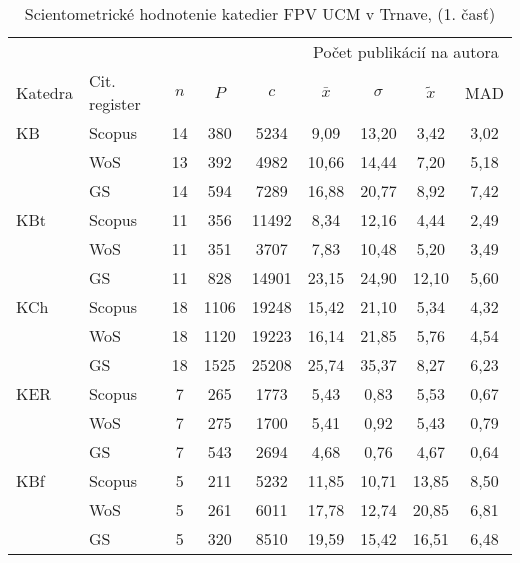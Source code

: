 {\begin{table}
\centering\small
  \caption[Hodnotenie FPV\,--\,počet publikácií na autora]{Scientometrické hodnotenie katedier FPV UCM v Trnave, (1. časť)}
  \label{tab:1-staff.results}
\begin{tabularx}{\textwidth}{lXc@{\hspace{2.5em}}c@{\hspace{2.5em}}c@{\hspace{3.5em}}cccc}
  \toprule\noalign{\vspace{.3ex}}
         &        &   &     &      & \multicolumn{4}{c}{Počet publikácií na autora}  \\
 Katedra & Cit. register  & $n$   & $P$     &  $c$     & $\bar{x}$      & $\sigma$  & $\tilde{x}$   & MAD  \\[0.3ex]
\midrule\noalign{\vspace{.5ex}}
 KB   & Scopus & 14 & 380  & 5234  & 9,09          & 13,20 & 3,42  & 3,02 \\
      & WoS    & 13 & 392  & 4982  & 10,66         & 14,44 & 7,20  & 5,18 \\
      & GS     & 14 & 594  & 7289  & 16,88         & 20,77 & 8,92  & 7,42 \\[3ex]
 KBt  & Scopus & 11 & 356  & 11492 & 8,34          & 12,16 & 4,44  & 2,49 \\
      & WoS    & 11 & 351  & 3707  & 7,83          & 10,48 & 5,20  & 3,49 \\
      & GS     & 11 & 828  & 14901 & 23,15         & 24,90 & 12,10 & 5,60 \\[3ex]
 KCh  & Scopus & 18 & 1106 & 19248 & 15,42         & 21,10 & 5,34  & 4,32 \\
      & WoS    & 18 & 1120 & 19223 & 16,14         & 21,85 & 5,76  & 4,54 \\
      & GS     & 18 & 1525 & 25208 & 25,74         & 35,37 & 8,27  & 6,23 \\[3ex]
 KER  & Scopus & 7  & 265  & 1773  & 5,43          & 0,83  & 5,53  & 0,67 \\
      & WoS    & 7  & 275  & 1700  & 5,41          & 0,92  & 5,43  & 0,79 \\
      & GS     & 7  & 543  & 2694  & 4,68          & 0,76  & 4,67  & 0,64 \\[3ex]
 KBf  & Scopus & 5  & 211  & 5232  & 11,85         & 10,71 & 13,85 & 8,50 \\
      & WoS    & 5  & 261  & 6011  & 17,78         & 12,74 & 20,85 & 6,81 \\
      & GS     & 5  & 320  & 8510  & 19,59         & 15,42 & 16,51 & 6,48 \\[3ex]

\end{tabularx}
\end{table}}
